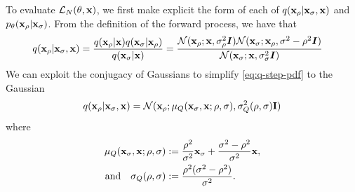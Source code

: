 To evaluate $\mathcal{L}_N(\theta, {\mathbf{x}})$, we first make explicit the form of each of $q({\mathbf{x}}_{\rho} | {\mathbf{x}}_{\sigma}, {\mathbf{x}})$ and $p_\theta({\mathbf{x}}_{\rho} | {\mathbf{x}}_{\sigma})$. From the definition of the forward process, we have that
\begin{align} \label{eq:q-step-pdf}
    q({\mathbf{x}}_{\rho} | {\mathbf{x}}_{\sigma}, {\mathbf{x}}) &= \frac{q({\mathbf{x}}_{\rho} | {\mathbf{x}}) q({\mathbf{x}}_{\sigma} | {\mathbf{x}}_{\rho})}{q({\mathbf{x}}_{\sigma}|{\mathbf{x}})} = \frac{{\mathcal{N}}({\mathbf{x}}_{\rho}; {\mathbf{x}}, \sigma_{\rho}^2 {\bm{I}}) {\mathcal{N}}({\mathbf{x}}_{\sigma}; {\mathbf{x}}_{\rho}, \sigma^2-\rho^2 {\bm{I}}) }{{\mathcal{N}}({\mathbf{x}}_{\sigma}; {\mathbf{x}}, \sigma_{\sigma}^2 {\bm{I}})}
\end{align}
We can exploit the conjugacy of Gaussians to simplify \cref{eq:q-step-pdf} to the Gaussian
\begin{align}
    q({\mathbf{x}}_\rho|{\mathbf{x}}_\sigma,{\mathbf{x}}) = {\mathcal{N}}( {\mathbf{x}}_\rho; \mathbf{\mu}_Q({\mathbf{x}}_\sigma, {\mathbf{x}}; \rho, \sigma), \sigma_Q^2(\rho, \sigma) \mathbf{I})
\end{align}
where
\begin{align} \label{eq:mu-q}
    \mathbf{\mu}_Q({\mathbf{x}}_\sigma, {\mathbf{x}}; \rho, \sigma) &:= \frac{\rho^2}{\sigma^2} {\mathbf{x}}_\sigma + \frac{\sigma^2-\rho^2}{\sigma^2} {\mathbf{x}}, \\
    \label{eq:sigma-q}
    \text{and}\quad 
    \sigma_Q(\rho, \sigma) &:= \frac{\rho^2 (\sigma^2-\rho^2)}{\sigma^2}.
\end{align}

